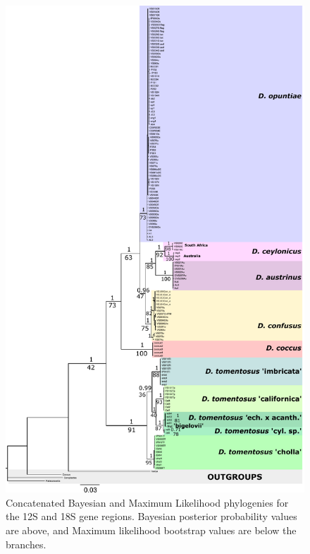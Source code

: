 \begin{figure}[H]
	\centering
	\includegraphics[scale =0.75]{Images/bayesian_concat2.pdf}
	\caption{Concatenated Bayesian and Maximum Likelihood phylogenies for the 12S and 18S gene regions. Bayesian posterior probability values are above, and Maximum likelihood bootstrap values are below the branches.} 
	\label{fig:concatTrees}
\end{figure}

